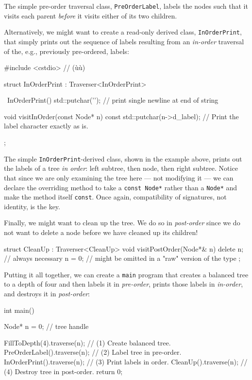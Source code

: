 \noindent The simple pre-order traversal class, \lstinline!PreOrderLabel!, labels the
nodes such that it visits each parent \emph{before} it visits either of
its two children.

Alternatively, we might want to create a read-only derived class,
\lstinline!InOrderPrint!, that simply prints out the sequence of labels
resulting from an \emph{in-order} traversal of the, e.g., previously
pre-ordered, labels:

\begin{emcppslisting}[emcppsbatch=e9]
#include <cstdio>  // (ù{}ù)

struct InOrderPrint : Traverser<InOrderPrint>
{
    ~InOrderPrint()
    {
        std::putchar('\n');  // print single newline at end of string
    }

    void visitInOrder(const Node* n) const
    {
        std::putchar(n->d_label);  // Print the label character exactly as is.
    }
};
\end{emcppslisting}
    
\noindent The simple \lstinline!InOrderPrint!-derived class, shown in the example above, prints out the
labels of a tree \emph{in order}: left subtree, then node, then right
subtree. Notice that since we are only examining the tree here --- not
modifying it --- we can declare the overriding method to take a
\lstinline!const!~\lstinline!Node*! rather than a \lstinline!Node*! and make the
method itself \lstinline!const!. Once again, compatibility of signatures,
not identity, is the key.

Finally, we might want to clean up the tree. We do so in
\emph{post-order} since we do not want to delete a node before we have
cleaned up its children!

\begin{emcppslisting}[emcppsbatch=e9]
struct CleanUp : Traverser<CleanUp>
{
    void visitPostOrder(Node*& n)
    {
        delete n;  // always necessary
        n = 0;     // might be omitted in a "raw" version of the type
    }
};
\end{emcppslisting}
    
\noindent Putting it all together, we can create a \lstinline!main! program that
creates a balanced tree to a depth of four and then labels it in
\emph{pre-order}, prints those labels in \emph{in-order}, and destroys
it in \emph{post-order}:

\begin{emcppslisting}[emcppsbatch=e9]
int main()
{
    Node* n = 0;                  // tree handle

    FillToDepth(4).traverse(n);   // (1) Create balanced tree.
    PreOrderLabel().traverse(n);  // (2) Label tree in pre-order.
    InOrderPrint().traverse(n);   // (3) Print labels in order.
    CleanUp().traverse(n);        // (4) Destroy tree in post-order.
    return 0;
}
\end{emcppslisting}
    
